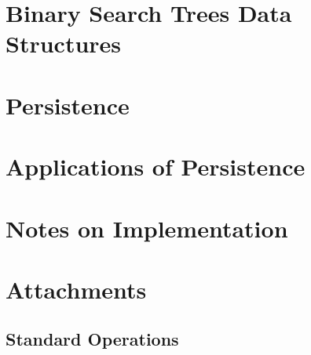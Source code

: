 \documentclass[12pt,a4paper]{report}
\let\openright=\clearpage
\begin{document}


\tableofcontents



\chapter{Binary Search Trees Data Structures}









\chapter{Persistence}



\chapter{Applications of Persistence}



\chapter{Notes on Implementation}









\appendix
\chapter{Attachments}

\section{Standard Operations}



\openright
\end{document}
